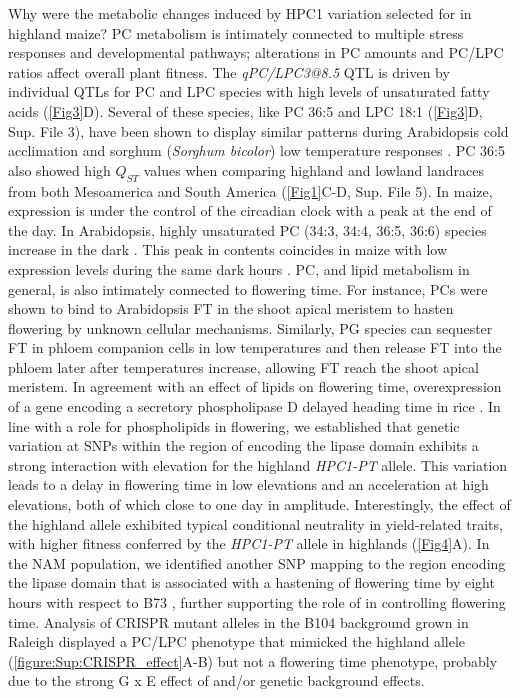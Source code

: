 Why were the metabolic changes induced by HPC1 variation selected for in highland maize?
PC metabolism is intimately connected to multiple stress responses and developmental pathways; alterations in PC amounts and PC/LPC ratios affect overall plant fitness.
The \textit{qPC/LPC3@8.5} QTL is driven by individual QTLs for PC and LPC species with high levels of unsaturated fatty acids (\cref{Fig3}D).
Several of these species, like PC 36:5 and LPC 18:1 (\cref{Fig3}D, Sup. File 3), have been shown to display similar patterns during Arabidopsis cold acclimation \cite{Welti2002-uk} and sorghum (\textit{Sorghum bicolor}) low temperature responses \cite{Marla2017-ph}.
PC 36:5 also showed high $Q_{ST}$ values when comparing highland and lowland landraces from both Mesoamerica and South America (\cref{Fig1}C-D, Sup. File 5).
In maize, \hpc expression is under the control of the circadian clock \cite{Khan2010-iv} with a peak at the end of the day. 
In Arabidopsis, highly unsaturated PC (34:3, 34:4, 36:5, 36:6) species increase in the dark \cite{Maatta2012-ip}. 
This peak in contents coincides in maize with low \hpc expression levels during the same dark hours \cite{Khan2010-iv}.
PC, and lipid metabolism in general, is also intimately connected to flowering time. 
For instance, PCs were shown to bind to Arabidopsis FT in the shoot apical meristem to hasten flowering \cite{Nakamura2014-qf, Nakamura2019-ht} by unknown cellular mechanisms. 
Similarly, PG species can sequester FT in phloem companion cells in low temperatures \cite{Susila2021-dz} and then release FT into the phloem later after temperatures increase, allowing FT reach the shoot apical meristem.   
In agreement with an effect of lipids on flowering time, overexpression of a gene encoding a secretory phospholipase D delayed heading time in rice \cite{Qu2021-wc}.
In line with a role for phospholipids in flowering, we established that genetic variation at SNPs within the region of \hpc encoding the lipase domain exhibits a strong interaction with elevation for the highland \textit{HPC1-PT} allele. 
This variation leads to a delay in flowering time in low elevations and an acceleration at high elevations, both of which close to one day in amplitude. 
Interestingly, the effect of the highland \hpc allele exhibited typical conditional neutrality in yield-related traits, with higher fitness conferred by the \textit{HPC1-PT} allele in highlands (\cref{Fig4}A). 
In the NAM population, we identified another SNP mapping to the region encoding the lipase domain that is associated with a hastening of flowering time by eight hours with respect to B73 \cite{Wallace2014-yy}, further supporting the role of \hpc in controlling flowering time. 
Analysis of \hpc CRISPR mutant alleles in the B104 background grown in Raleigh displayed a PC/LPC phenotype that mimicked the highland allele (\cref{figure:Sup:CRISPR_effect}A-B) but not a flowering time phenotype, probably due to the strong G x E effect of \hpc and/or genetic background effects. 

